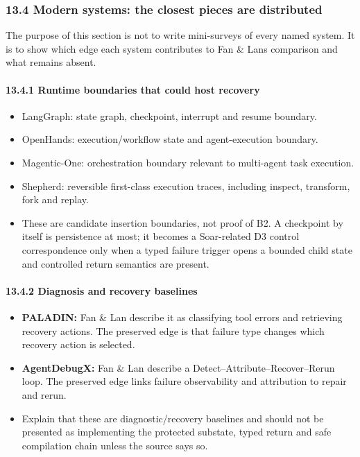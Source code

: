 \subsubsection{13.4 Modern systems: the closest pieces are distributed}\label{134-modern-systems-the-closest-pieces-are-distributed}

The purpose of this section is not to write mini-surveys of every named system. It is to show which edge each system contributes to Fan \& Lan\textquotesingle s comparison and what remains absent.

\paragraph{13.4.1 Runtime boundaries that could host recovery}\label{1341-runtime-boundaries-that-could-host-recovery}

\begin{itemize}
\tightlist
\item
  LangGraph: state graph, checkpoint, interrupt and resume boundary.
\item
  OpenHands: execution/workflow state and agent-execution boundary.
\item
  Magentic-One: orchestration boundary relevant to multi-agent task execution.
\item
  Shepherd: reversible first-class execution traces, including inspect, transform, fork and replay.
\item
  These are candidate insertion boundaries, not proof of B2. A checkpoint by itself is persistence at most; it becomes a Soar-related D3 control correspondence only when a typed failure trigger opens a bounded child state and controlled return semantics are present.
\end{itemize}

\paragraph{13.4.2 Diagnosis and recovery baselines}\label{1342-diagnosis-and-recovery-baselines}

\begin{itemize}
\tightlist
\item
  \textbf{PALADIN:} Fan \& Lan describe it as classifying tool errors and retrieving recovery actions. The preserved edge is that failure type changes which recovery action is selected.
\item
  \textbf{AgentDebugX:} Fan \& Lan describe a Detect--Attribute--Recover--Rerun loop. The preserved edge links failure observability and attribution to repair and rerun.
\item
  Explain that these are diagnostic/recovery baselines and should not be presented as implementing the protected substate, typed return and safe compilation chain unless the source says so.
\end{itemize}


